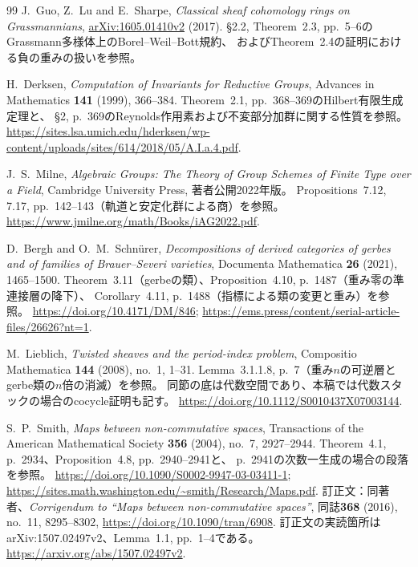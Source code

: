 \begin{thebibliography}{99}
J.~Guo, Z.~Lu and E.~Sharpe,
\emph{Classical sheaf cohomology rings on Grassmannians},
\href{https://arxiv.org/abs/1605.01410v2}{arXiv:1605.01410v2} (2017).
\S2.2, Theorem~2.3, pp.~5--6のGrassmann多様体上のBorel--Weil--Bott規約、
およびTheorem~2.4の証明における負の重みの扱いを参照。

H.~Derksen,
\emph{Computation of Invariants for Reductive Groups},
Advances in Mathematics \textbf{141} (1999), 366--384.
Theorem~2.1, pp.~368--369のHilbert有限生成定理と、
\S2, p.~369のReynolds作用素および不変部分加群に関する性質を参照。
\url{https://sites.lsa.umich.edu/hderksen/wp-content/uploads/sites/614/2018/05/A.I.a.4.pdf}.

J.~S.~Milne,
\emph{Algebraic Groups: The Theory of Group Schemes of Finite Type over a Field},
Cambridge University Press, 著者公開2022年版。
Propositions~7.12, 7.17, pp.~142--143（軌道と安定化群による商）を参照。
\url{https://www.jmilne.org/math/Books/iAG2022.pdf}.

D.~Bergh and O.~M.~Schn\"urer,
\emph{Decompositions of derived categories of gerbes and of families of Brauer--Severi varieties},
Documenta Mathematica \textbf{26} (2021), 1465--1500.
Theorem~3.11（gerbeの類）、Proposition~4.10, p.~1487（重み零の準連接層の降下）、
Corollary~4.11, p.~1488（指標による類の変更と重み）を参照。
\url{https://doi.org/10.4171/DM/846};
\url{https://ems.press/content/serial-article-files/26626?nt=1}.

M.~Lieblich,
\emph{Twisted sheaves and the period-index problem},
Compositio Mathematica \textbf{144} (2008), no.~1, 1--31.
Lemma~3.1.1.8, p.~7（重み$n$の可逆層とgerbe類の$n$倍の消滅）を参照。
同節の底は代数空間であり、本稿では代数スタックの場合のcocycle証明も記す。
\url{https://doi.org/10.1112/S0010437X07003144}.

S.~P.~Smith,
\emph{Maps between non-commutative spaces},
Transactions of the American Mathematical Society \textbf{356} (2004), no.~7, 2927--2944.
Theorem~4.1, p.~2934、Proposition~4.8, pp.~2940--2941と、
p.~2941の次数一生成の場合の段落を参照。
\url{https://doi.org/10.1090/S0002-9947-03-03411-1};
\url{https://sites.math.washington.edu/~smith/Research/Maps.pdf}.
訂正文：同著者、\emph{Corrigendum to ``Maps between non-commutative spaces''},
同誌\textbf{368} (2016), no.~11, 8295--8302,
\url{https://doi.org/10.1090/tran/6908}.
訂正文の実読箇所はarXiv:1507.02497v2、Lemma~1.1, pp.~1--4である。
\url{https://arxiv.org/abs/1507.02497v2}.


\end{thebibliography}
